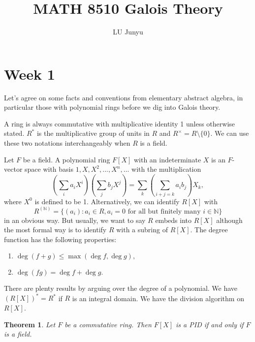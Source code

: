 \documentclass[12pt,reqno]{amsart}
\newtheorem{thm}{Theorem}[section]
\theoremstyle{definition}
\theoremstyle{definition}
\def\NN{\mathbb{N}}
\begin{document}
\title{MATH 8510 Galois Theory}
\author{LU Junyu}


\maketitle

\section{Week 1}
\label{Week 1}

\noindent Let's agree on some facts and conventions from elementary abstract algebra, in particular those with polynomial rings before we dig into Galois theory.

\smallskip

A ring is always commutative with multiplicative identity 1 unless otherwise stated. $R^*$ is the multiplicative group of units in $R$ and $R^\times = R\setminus \{0\}$. We can use these two notations interchangeably when $R$ is a field.

\smallskip

Let $F$ be a field. A polynomial ring $F[X]$ with an indeterminate $X$ is an $F$-vector space with basis $1,X,X^2,...,X^n,...$ with the multiplication $$(\sum_i a_iX^i)(\sum_j b_j X^j) =  \sum_k (\sum_{i+j=k}a_ib_j)X_k,$$ where $X^0$ is defined to be 1. Alternatively, we can identify $R[X]$ with $$R^{(\NN)}=\{(a_i): a_i\in R, a_i=0 \mbox{ for all but finitely many }i\in\NN\}$$ in an obvious way. But usually, we want to say $R$ embeds into $R[X]$ although the most formal way is to identify $R$ with a subring of $R[X]$. The degree function has the following properties:
\begin{enumerate}
    \item $\deg(f+g) \leq \max(\deg f,\deg g),$
    \item $\deg(fg)=\deg f+\deg g.$
\end{enumerate}

There are plenty results by arguing over the degree of a polynomial. We have $(R[X])^* =  R^*$ if $R$ is an integral domain. We have the division algorithm on $R[X]$.

\begin{thm}
Let $F$ be a commutative ring. Then $F[X]$ is a PID if and only if $F$ is a field.
\end{thm}
\end{document}
